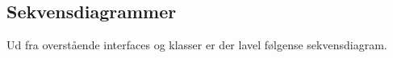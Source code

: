 
\subsection{Sekvensdiagrammer}
Ud fra overstående interfaces og klasser er der lavel følgense sekvensdiagram.

